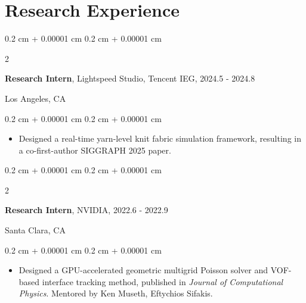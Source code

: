 \documentclass[10pt, letterpaper]{article}
\newenvironment{highlights}{
    \begin{itemize}[
        topsep=0.10 cm,
        parsep=0.10 cm,
        partopsep=0pt,
        itemsep=0pt,
        leftmargin=0.4 cm + 10pt
    ]
}{
    \end{itemize}
} %
\newenvironment{onecolentry}{
    \begin{adjustwidth}{
        0.2 cm + 0.00001 cm
    }{
        0.2 cm + 0.00001 cm
    }
}{
    \end{adjustwidth}
} %
\newenvironment{twocolentry}[2][]{
    \onecolentry
    \def\secondColumn{#2}
    \setcolumnwidth{\fill, 4.5 cm}
    \begin{paracol}{2}
}{
    \switchcolumn \raggedleft \secondColumn
    \end{paracol}
    \endonecolentry
} %
\begin{document}
    
    \section{Research Experience}
    
    
    
    \begin{twocolentry}{
    Los Angeles, CA\\}
    \textbf{Research Intern}, Lightspeed Studio, Tencent IEG, 2024.5 - 2024.8 
    \end{twocolentry}
    \begin{onecolentry}
    \begin{highlights}
    \item Designed a real-time yarn-level knit fabric simulation framework, resulting in a co-first-author SIGGRAPH 2025 paper.
    \end{highlights}
    \end{onecolentry}
    
    \vspace{0.15 cm}
    
    \begin{twocolentry}{
    Santa Clara, CA\\}
    \textbf{Research Intern}, NVIDIA, 2022.6 - 2022.9
    \end{twocolentry}
    \begin{onecolentry}
    \begin{highlights}
    \item Designed a GPU-accelerated geometric multigrid Poisson solver and VOF-based interface tracking method, published in \textit{Journal of Computational Physics}. Mentored by Ken Museth, Eftychios Sifakis.
    \end{highlights}
    \end{onecolentry}
\end{document}
